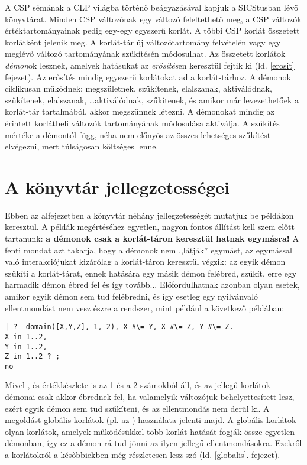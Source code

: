 A CSP sémának a CLP világba történő beágyazásával kapjuk a SICStusban lévő
\clpfd könyvtárat. Minden CSP változónak egy \clpfd változó feleltethető meg,
a CSP változók értéktartományainak pedig egy-egy \clpfd egyszerű korlát.
A többi CSP korlát összetett \clpfd korlátként jelenik meg. A \clpfd korlát-tár
új változótartomány felvételén vagy egy meglévő változó tartományának
szűkítésén módosulhat. Az összetett korlátok \emph{démon}ok lesznek, amelyek
hatásukat az \emph{erősítés}en keresztül fejtik ki (ld. \ref{erosit} fejezet).
Az erősítés mindig egyszerű korlátokat ad a korlát-tárhoz. A démonok ciklikusan
működnek: megszületnek, szűkítenek, elalszanak, aktiválódnak, szűkítenek,
elalszanak, \ldots aktiválódnak, szűkítenek, és amikor már levezethetőek a
korlát-tár tartalmából, akkor megszűnnek létezni. A démonokat mindig az
érintett korlátbeli változók tartományának módosulása aktiválja. A szűkítés
mértéke a démontól függ, néha nem előnyös az összes lehetséges szűkítést
elvégezni, mert túlságosan költséges lenne.

\section{A \clpfd könyvtár jellegzetességei}

Ebben az alfejezetben a \clpfd könyvtár néhány jellegzetességét mutatjuk be
példákon keresztül. A példák megértéséhez egyetlen, nagyon fontos állítást
kell szem előtt tartanunk: {\bf a \clpfd démonok csak a korlát-táron keresztül
hatnak egymásra!}
\br
A fenti mondat azt takarja, hogy a démonok nem ,,látják'' egymást, az
egymással való interakciójukat kizárólag a korlát-táron keresztül
végzik: az egyik démon szűkíti a korlát-tárat, ennek hatására egy
másik démon felébred, szűkít, erre egy harmadik démon ébred fel
és így tovább... Előfordulhatnak azonban olyan esetek, amikor egyik
démon sem tud felébredni, és így esetleg egy nyilvánvaló ellentmondást
nem vesz észre a rendszer, mint például a következő példában:

\begin{verbatim}
| ?- domain([X,Y,Z], 1, 2), X #\= Y, X #\= Z, Y #\= Z.
X in 1..2,
Y in 1..2,
Z in 1..2 ? ;
no
\end{verbatim}

Mivel ,  és  értékkészlete is az 1 és a 2 számokból
áll, és az  jellegű korlátok démonai csak akkor ébrednek fel, ha
valamelyik változójuk behelyettesített lesz, ezért egyik démon sem tud szűkíteni,
és az ellentmondás nem derül ki. A megoldást globális korlátok (pl. az
) használata jelenti majd. A globális korlátok olyan korlátok,
amelyek működésükkel több korlát hatását fogják össze egyetlen démonban, így
ez a démon rá tud jönni az ilyen jellegű ellentmondásokra. Ezekről a korlátokról
a későbbiekben még részletesen lesz szó (ld. \ref{globalis}. fejezet).

